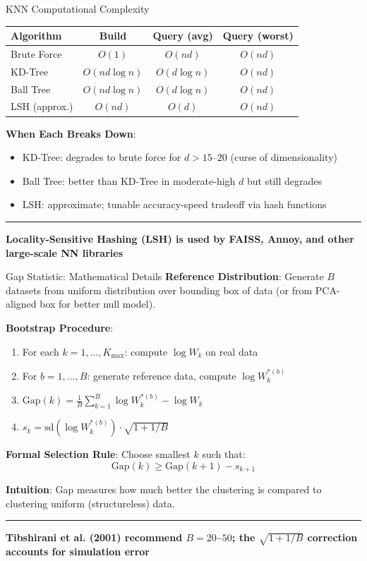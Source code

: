 \documentclass[8pt,aspectratio=169]{beamer}
\newcommand{\bottomnote}[1]{%
\vfill
\vspace{-2mm}
\textcolor{mllavender2}{\rule{\textwidth}{0.4pt}}
\vspace{1mm}
\footnotesize
\textbf{#1}
}
\begin{document}
\begin{frame}[t]{KNN Computational Complexity}
\begin{center}
\begin{tabular}{lccc}
\toprule
\textbf{Algorithm} & \textbf{Build} & \textbf{Query (avg)} & \textbf{Query (worst)} \\
\midrule
Brute Force & $O(1)$ & $O(nd)$ & $O(nd)$ \\
KD-Tree & $O(nd \log n)$ & $O(d \log n)$ & $O(nd)$ \\
Ball Tree & $O(nd \log n)$ & $O(d \log n)$ & $O(nd)$ \\
LSH (approx.) & $O(nd)$ & $O(d)$ & $O(nd)$ \\
\bottomrule
\end{tabular}
\end{center}
\vspace{0.3em}
\textbf{When Each Breaks Down}:
\begin{itemize}
\item KD-Tree: degrades to brute force for $d > 15$--$20$ (curse of dimensionality)
\item Ball Tree: better than KD-Tree in moderate-high $d$ but still degrades
\item LSH: approximate; tunable accuracy-speed tradeoff via hash functions
\end{itemize}
\bottomnote{Locality-Sensitive Hashing (LSH) is used by FAISS, Annoy, and other large-scale NN libraries}
\end{frame}

\begin{frame}[t]{Gap Statistic: Mathematical Details}
\textbf{Reference Distribution}: Generate $B$ datasets from uniform distribution over bounding box of data (or from PCA-aligned box for better null model).

\textbf{Bootstrap Procedure}:
\begin{enumerate}
\item For each $k = 1, \ldots, K_{\max}$: compute $\log W_k$ on real data
\item For $b = 1, \ldots, B$: generate reference data, compute $\log W_k^{*(b)}$
\item $\text{Gap}(k) = \frac{1}{B}\sum_{b=1}^B \log W_k^{*(b)} - \log W_k$
\item $s_k = \text{sd}(\log W_k^{*(b)}) \cdot \sqrt{1 + 1/B}$
\end{enumerate}
\vspace{0.3em}
\textbf{Formal Selection Rule}: Choose smallest $k$ such that:
$$\text{Gap}(k) \geq \text{Gap}(k+1) - s_{k+1}$$

\textbf{Intuition}: Gap measures how much better the clustering is compared to clustering uniform (structureless) data.
\bottomnote{Tibshirani et al. (2001) recommend $B = 20$--$50$; the $\sqrt{1+1/B}$ correction accounts for simulation error}
\end{frame}
\end{document}
